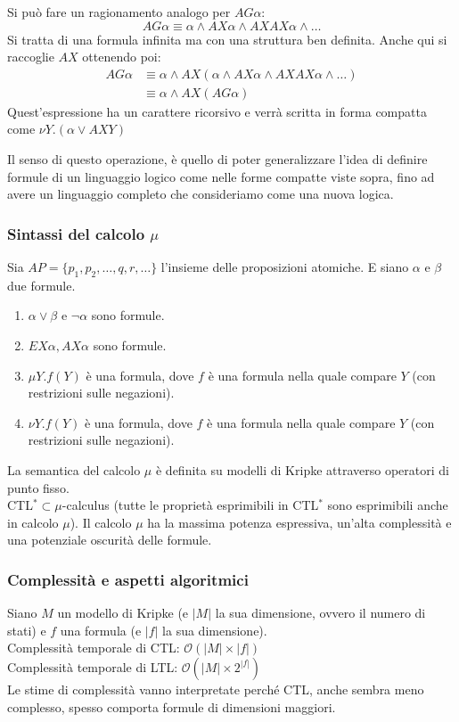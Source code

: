 Si può fare un ragionamento analogo per $AG \alpha$:
\[AG \alpha \equiv \alpha \land AX\alpha \land AXAX \alpha \land \dots\]
Si tratta di una formula infinita ma con una struttura ben definita. Anche qui si raccoglie $AX$ ottenendo poi:
\begin{equation*}
    \begin{split}
        AG \alpha   & \equiv \alpha \land AX(\alpha \land AX \alpha \land AXAX \alpha \land \dots) \\
                    & \equiv \alpha \land AX(AG \alpha)
    \end{split}
\end{equation*}
Quest’espressione ha un carattere ricorsivo e verrà scritta in forma compatta come $\nu Y.(\alpha \lor AXY)$

Il senso di questo operazione, è quello di poter generalizzare l'idea di definire formule di un linguaggio logico come nelle forme compatte viste sopra, fino ad avere un linguaggio completo che consideriamo come una nuova logica. 
\subsubsection{Sintassi del calcolo $\mu$}
Sia $AP = \{p_1, p_2, \dots, q, r, \dots\}$ l’insieme delle proposizioni atomiche. E siano $\alpha$ e $\beta$ due formule.
\begin{enumerate}
    \item $\alpha \lor \beta$ e $\neg \alpha$ sono formule.
    \item $EX \alpha, AX \alpha$ sono formule.
    \item $\mu Y.f(Y)$ è una formula, dove $f$ è una formula nella quale compare $Y$ (con restrizioni sulle negazioni).
    \item $\nu Y. f(Y)$ è una formula, dove $f$ è una formula nella quale compare $Y$ (con restrizioni sulle negazioni).
\end{enumerate}

La semantica del calcolo $\mu$ è definita su modelli di Kripke attraverso operatori di punto fisso.\\

CTL$^* \subset \mu$-calculus (tutte le proprietà esprimibili in CTL$^*$ sono esprimibili anche in calcolo $\mu$). Il calcolo $\mu$ ha la massima potenza espressiva, un’alta complessità e una potenziale oscurità delle formule.

\subsubsection{Complessità e aspetti algoritmici}
Siano $M$ un modello di Kripke (e $|M|$ la sua dimensione, ovvero il numero di stati) e $f$ una formula (e $|f|$ la sua dimensione).\\
Complessità temporale di CTL: $\mathcal{O}(|M| \times |f|)$\\
Complessità temporale di LTL: $\mathcal{O}(|M| \times 2^{|f|})$\\
Le stime di complessità vanno interpretate perché CTL, anche sembra meno complesso, spesso comporta formule di dimensioni maggiori.\\

